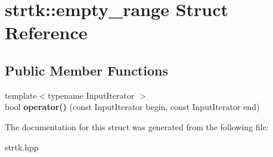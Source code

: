 \hypertarget{structstrtk_1_1empty__range}{\section{strtk\-:\-:empty\-\_\-range Struct Reference}
\label{structstrtk_1_1empty__range}
}
\subsection*{Public Member Functions}
\begin{DoxyCompactItemize}
\item 
\hypertarget{structstrtk_1_1empty__range_a7baa0d630a83b22ccc5f0cafb01dd3cb}{{\footnotesize template$<$typename Input\-Iterator $>$ }\\bool {\bfseries operator()} (const Input\-Iterator begin, const Input\-Iterator end)}\label{structstrtk_1_1empty__range_a7baa0d630a83b22ccc5f0cafb01dd3cb}

\end{DoxyCompactItemize}


The documentation for this struct was generated from the following file\-:\begin{DoxyCompactItemize}
\item 
strtk.\-hpp\end{DoxyCompactItemize}
